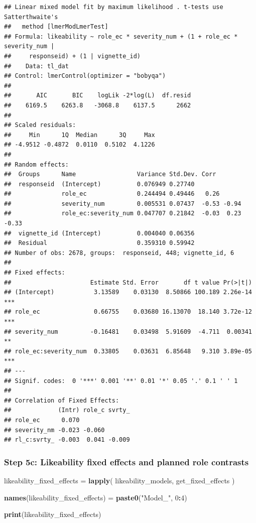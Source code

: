 \documentclass[
]{article}
\newenvironment{Shaded}{\begin{snugshade}}{\end{snugshade}}
\newcommand{\DecValTok}[1]{\textcolor[rgb]{0.00,0.00,0.81}{#1}}
\newcommand{\FunctionTok}[1]{\textcolor[rgb]{0.13,0.29,0.53}{\textbf{#1}}}
\newcommand{\NormalTok}[1]{#1}
\newcommand{\OtherTok}[1]{\textcolor[rgb]{0.56,0.35,0.01}{#1}}
\newcommand{\SpecialCharTok}[1]{\textcolor[rgb]{0.81,0.36,0.00}{\textbf{#1}}}
\newcommand{\StringTok}[1]{\textcolor[rgb]{0.31,0.60,0.02}{#1}}
\begin{document}
\begin{verbatim}
## Linear mixed model fit by maximum likelihood . t-tests use Satterthwaite's
##   method [lmerModLmerTest]
## Formula: likeability ~ role_ec * severity_num + (1 + role_ec * severity_num |  
##     responseid) + (1 | vignette_id)
##    Data: tl_dat
## Control: lmerControl(optimizer = "bobyqa")
## 
##       AIC       BIC    logLik -2*log(L)  df.resid 
##    6169.5    6263.8   -3068.8    6137.5      2662 
## 
## Scaled residuals: 
##     Min      1Q  Median      3Q     Max 
## -4.9512 -0.4872  0.0110  0.5102  4.1226 
## 
## Random effects:
##  Groups      Name                 Variance Std.Dev. Corr             
##  responseid  (Intercept)          0.076949 0.27740                   
##              role_ec              0.244494 0.49446   0.26            
##              severity_num         0.005531 0.07437  -0.53 -0.94      
##              role_ec:severity_num 0.047707 0.21842  -0.03  0.23 -0.33
##  vignette_id (Intercept)          0.004040 0.06356                   
##  Residual                         0.359310 0.59942                   
## Number of obs: 2678, groups:  responseid, 448; vignette_id, 6
## 
## Fixed effects:
##                      Estimate Std. Error       df t value Pr(>|t|)    
## (Intercept)           3.13589    0.03130  8.50866 100.189 2.26e-14 ***
## role_ec               0.66755    0.03680 16.13070  18.140 3.72e-12 ***
## severity_num         -0.16481    0.03498  5.91609  -4.711  0.00341 ** 
## role_ec:severity_num  0.33805    0.03631  6.85648   9.310 3.89e-05 ***
## ---
## Signif. codes:  0 '***' 0.001 '**' 0.01 '*' 0.05 '.' 0.1 ' ' 1
## 
## Correlation of Fixed Effects:
##             (Intr) role_c svrty_
## role_ec      0.070              
## severity_nm -0.023 -0.060       
## rl_c:svrty_ -0.003  0.041 -0.009
\end{verbatim}

\subsubsection{Step 5c: Likeability fixed effects and planned role
contrasts}\label{step-5c-likeability-fixed-effects-and-planned-role-contrasts}

\begin{Shaded}
\begin{Highlighting}[]
\NormalTok{likeability\_fixed\_effects }\OtherTok{=} \FunctionTok{lapply}\NormalTok{(}
\NormalTok{  likeability\_models,}
\NormalTok{  get\_fixed\_effects}
\NormalTok{)}

\FunctionTok{names}\NormalTok{(likeability\_fixed\_effects) }\OtherTok{=} \FunctionTok{paste0}\NormalTok{(}\StringTok{"Model\_"}\NormalTok{, }\DecValTok{0}\SpecialCharTok{:}\DecValTok{4}\NormalTok{)}

\FunctionTok{print}\NormalTok{(likeability\_fixed\_effects)}
\end{Highlighting}
\end{Shaded}
\end{document}
